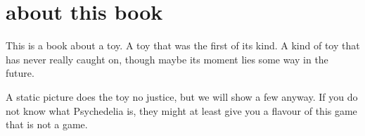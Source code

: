 \lhead[]{}
\rhead[]{}
\renewcommand{\headrulewidth}{0pt}
\chapter*{about this book} 
This is a book about a toy. A toy that was the first of its kind. A kind of toy that has never really caught on,
though maybe its moment lies some way in the future. 

A static picture does the toy no justice, but we will show a few anyway. If you do not know what Psychedelia is, they
might at least give you a flavour of this game that is not a game. 
\begin{figure}[H]
    \begin{adjustbox}{width=10cm,center}
      \hspace{0.1cm}
    \end{adjustbox}
\end{figure}
\vspace{-0.8cm}
